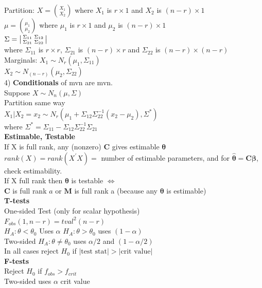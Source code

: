 \documentclass[10pt,landscape]{article}
\newenvironment{lsmallmatrix}
{\left|\begin{smallmatrix}}
	{\end{smallmatrix}\right|}
\newcommand{\B}{\beta}
\newcommand{\ta}{\theta}
\begin{document}
\begin{multicols*}{4}
	Partition:
	$X={X_1 \choose X_2}$ where $X_1$ is $r\times 1$ and $X_2$ is $(n-r)\times 1$\\
	$\mu={\mu_1\choose \mu_2}$ where $\mu_1$ is $r\times 1$ and $\mu_2$ is $(n-r)\times 1$\\
	$\Sigma=
	\begin{lsmallmatrix}
	\Sigma_{11}&\Sigma_{12}\\
	\Sigma_{21}&\Sigma_{22}
	\end{lsmallmatrix}$\\
	where $\Sigma_{11}$ is $r\times r$, $\Sigma_{21}$ is $(n-r)\times r$ and $\Sigma_{22}$ is $(n-r)\times (n-r)$\\
	Marginals:
	$X_1\sim N_r(\mu_1,\Sigma_{11})$\\ 
 $X_2\sim N_{(n-r)}(\mu_2,\Sigma_{22})$\\
4) \textbf{Conditionals} of mvn are mvn.\\
	Suppose $X\sim N_n(\mu,\Sigma)$\\
Partition same way\\
	$X_1|X_2=x_2\sim N_r(\mu_1+\Sigma_{12}\Sigma_{22}^{-1}(x_2-\mu_2),\Sigma^*)$\\
	where $\Sigma^*=\Sigma_{11}-\Sigma_{12}\Sigma_{22}^{-1}\Sigma_{21}$\\
\textbf{Estimable, Testable}\\
If X is full rank, any (nonzero) $\bm{C}$ gives estimable $\bm{\theta}$\\
$rank(X)=rank(X^{\prime}X)=$ number of estimable parameters, and for $\bm{\hat{\theta}}=\bm{C\B}$, check estimability.\\
If X full rank then $\bm{\theta}$ is testable $\Leftrightarrow$\\
$\bm{C}$ is full rank $a$ or $\bm{M}$ is full rank a (because any $\bm{\theta}$ is estimable)\\
\textbf{T-tests}\\
One-sided Test (only for scalar hypothesis)\\
$F_{obs}(1,n-r)=tval^2(n-r)$\\
$H_A:\ta<\ta_0$ Uses $\alpha$ $H_A:\ta>\ta_0$ uses $(1-\alpha)$\\
Two-sided $H_A:\ta\neq \ta_0$ uses $\alpha/2$ and $(1-\alpha/2)$\\
In all cases reject $H_0$ if $|\text{test stat}|>|\text{crit value}|$\\
\textbf{F-tests}\\
Reject $H_0$ if $f_{obs}>f_{crit}$\\
Two-sided uses $\alpha$ crit value\\

\end{multicols*}
\end{document}
